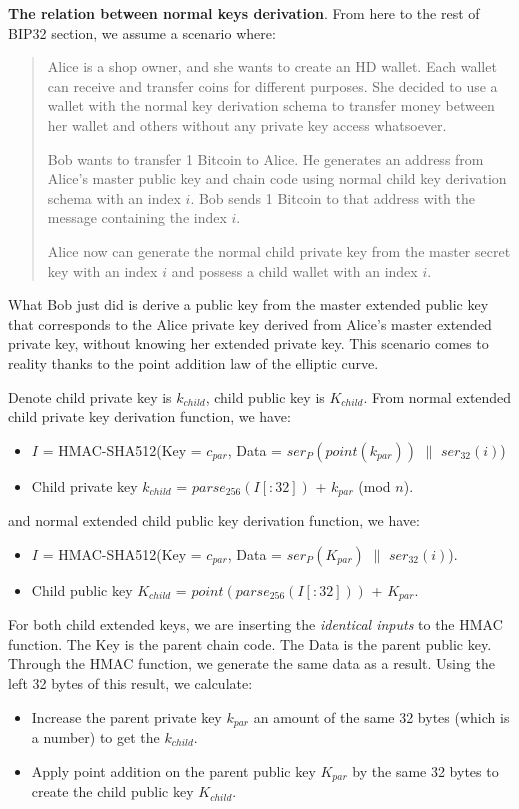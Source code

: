 \bigskip
{\textbf{The relation between normal keys derivation}}. From here to the rest of BIP32 section, we assume a scenario where:
\begin{quote}
    Alice is a shop owner, and she wants to create an HD wallet. Each wallet can receive and transfer coins for different purposes. She decided to use a wallet with the normal key derivation schema to transfer money between her wallet and others without any private key access whatsoever.

    Bob wants to transfer 1 Bitcoin to Alice. He generates an address from Alice's master public key and chain code using normal child key derivation schema with an index $i$. Bob sends 1 Bitcoin to that address with the message containing the index $i$.

    Alice now can generate the normal child private key from the master secret key with an index $i$ and possess a child wallet with an index $i$.

\end{quote}

What Bob just did is derive a public key from the master extended public key that corresponds to the Alice private key derived from Alice’s master extended private key, without knowing her extended private key. This scenario comes to reality thanks to the point addition law of the elliptic curve.

Denote child private key is $k_{child}$, child public key is $K_{child}$. From normal extended child private key derivation function, we have:

\begin{itemize}
    \item $I$ = HMAC-SHA512(Key = $c_{par}$, Data = $ser_P(point(k_{par}))$ $\parallel$ $ser_{32}(i)$)
    \item Child private key $k_{child}$ = $parse_{256}(I[:32])$ +  $k_{par}$ (mod $n$).
\end{itemize}

and normal extended child public key derivation function, we have:
\begin{itemize}
    \item $I$ = HMAC-SHA512(Key = $c_{par}$, Data = $ser_{P}(K_{par})$ $\parallel$ $ser_{32}(i)$).
    \item Child public key $K_{child}$ = $point(parse_{256}(I[:32]))$ + $K_{par}$.
\end{itemize}

For both child extended keys, we are inserting the \textit{identical inputs} to the HMAC function. The Key is the parent chain code. The Data is the parent public key. Through the HMAC function, we generate the same data as a result. Using the left 32 bytes of this result, we calculate:
\begin{itemize}
    \item Increase the parent private key $k_{par}$ an amount of the same 32 bytes (which is a number) to get the $k_{child}$.

    \item Apply point addition on the parent public key $K_{par}$ by the same 32 bytes to create the child public key $K_{child}$.
\end{itemize}

